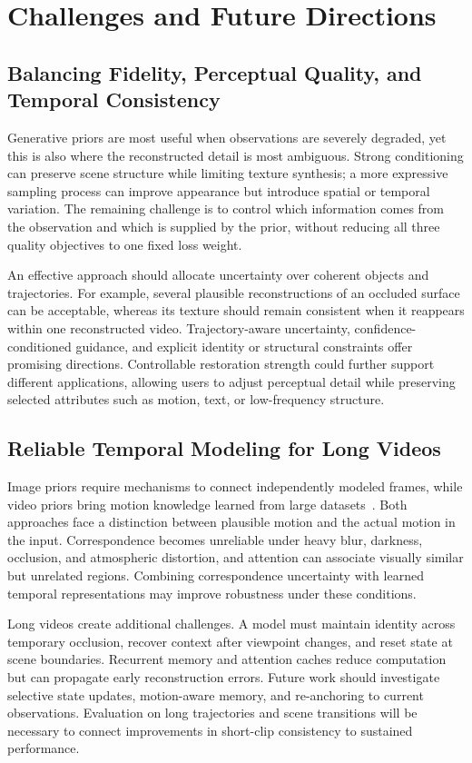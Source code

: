 \section{Challenges and Future Directions}
\label{sec:outlook}
\subsection{Balancing Fidelity, Perceptual Quality, and Temporal Consistency}
Generative priors are most useful when observations are severely degraded, yet this is also where the reconstructed detail is most ambiguous. Strong conditioning can preserve scene structure while limiting texture synthesis; a more expressive sampling process can improve appearance but introduce spatial or temporal variation. The remaining challenge is to control which information comes from the observation and which is supplied by the prior, without reducing all three quality objectives to one fixed loss weight.

An effective approach should allocate uncertainty over coherent objects and trajectories. For example, several plausible reconstructions of an occluded surface can be acceptable, whereas its texture should remain consistent when it reappears within one reconstructed video. Trajectory-aware uncertainty, confidence-conditioned guidance, and explicit identity or structural constraints offer promising directions. Controllable restoration strength could further support different applications, allowing users to adjust perceptual detail while preserving selected attributes such as motion, text, or low-frequency structure.

\subsection{Reliable Temporal Modeling for Long Videos}
Image priors require mechanisms to connect independently modeled frames, while video priors bring motion knowledge learned from large datasets~\cite{svd,wan}. Both approaches face a distinction between plausible motion and the actual motion in the input. Correspondence becomes unreliable under heavy blur, darkness, occlusion, and atmospheric distortion, and attention can associate visually similar but unrelated regions. Combining correspondence uncertainty with learned temporal representations may improve robustness under these conditions.

Long videos create additional challenges. A model must maintain identity across temporary occlusion, recover context after viewpoint changes, and reset state at scene boundaries. Recurrent memory and attention caches reduce computation but can propagate early reconstruction errors. Future work should investigate selective state updates, motion-aware memory, and re-anchoring to current observations. Evaluation on long trajectories and scene transitions will be necessary to connect improvements in short-clip consistency to sustained performance.

